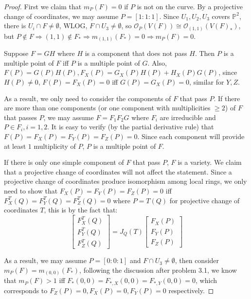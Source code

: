 \documentclass{solution}
\begin{document}
\begin{proof}
    First we claim that $m_P(F) = 0$ if $P$ is not on the curve. By a projective change of coordinates, we may assume $P = [1:1:1]$. Since $U_1, U_2, U_3$ covers $\mathbb{P}^2$, there is $U_i \cap F \ne \emptyset$, WLOG, $F \cap U_3 \ne \emptyset$, so $\mathcal{O}_P(V(F)) \cong \mathcal{O}_{(1, 1)}(V(F)_*)$, but $P \notin F \Rightarrow (1, 1) \notin F_* \Rightarrow m_{(1, 1)}(F_*) = 0 \Rightarrow m_P(F) = 0$.

    Suppose $F = GH$ where $H$ is a component that does not pass $H$. Then $P$ is a multiple point of $F$ iff $P$ is a multiple point of $G$. Also, $F(P) = G(P)H(P), F_X(P) = G_X(P) H(P) + H_X(P)G(P)$, since $H(P) \ne 0$, $F(P) = F_X(P) = 0$ iff $G(P) = G_X(P) = 0$, similar for $Y, Z$.

    As a result, we only need to consider the components of $F$ that pass $P$. If there are more than one components (or one component with multiplicities $\ge 2$) of $F$ that passes $P$, we may assume $F = F_1F_2G$ where $F_i$ are irreducible and $P \in F_i, i = 1, 2$. It is easy to verify (by the partial derivative rule) that $F(P) = F_X(P) = F_Y(P) = F_Z(P) = 0$. Since each component will provide at least $1$ multiplicity of $P$, $P$ is a multiple point of $F$.

    If there is only one simple component of $F$ that pass $P$, $F$ is a variety. We claim that a projective change of coordinates will not affect the statement. Since a projective change of coordinates produce isomorphism among local rings, we only need to show that $F_X(P) = F_Y(P) = F_Z(P) = 0$ iff $F_X^T(Q) = F_Y^T(Q) = F_Z^T(Q) = 0$ where $P = T(Q)$ for projective change of coordinates $T$, this is by the fact that:
    $$\begin{bmatrix}F_X^T(Q) \\F_Y^T(Q) \\ F_Z^T(Q)\end{bmatrix} = J_Q(T) \begin{bmatrix} F_X(P) \\F_Y(P) \\ F_Z(P) \end{bmatrix}$$

    As a result, we may assume $P = [0:0:1]$ and $F \cap U_3 \ne \emptyset$, then consider $m_P(F) = m_{(0, 0)}(F_*)$, following the discussion after problem 3.1, we know that $m_P(F) \gt 1$ iff $F_{*}(0, 0) = F_{*, X}(0, 0) = F_{*, Y}(0, 0) = 0$, which corresponds to $F_{Z}(P) = 0, F_X(P) = 0, F_Y(P) = 0$ respectively. 
\end{proof}
\end{document}

